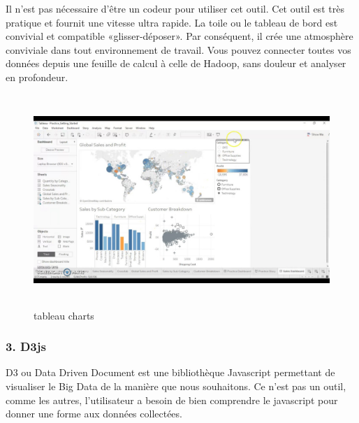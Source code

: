 \documentclass[french, a4paper, 12pt]{report}
\begin{document}
Il n’est pas nécessaire d’être un codeur pour utiliser cet outil. Cet outil est très pratique et fournit une vitesse ultra rapide. La toile ou le tableau de bord est convivial et compatible «glisser-déposer». Par conséquent, il crée une atmosphère conviviale dans tout environnement de travail. Vous pouvez connecter toutes vos données depuis une feuille de calcul à celle de Hadoop, sans douleur et analyser en profondeur.
\begin{figure}[!htp]
    \centering
    \includegraphics[height=8cm]{images/tableau.jpg}
    \caption{tableau charts}
    \label{fig:2.16}
\end{figure}
\subsubsection{3. D3js}
D3 ou Data Driven Document est une bibliothèque Javascript permettant de visualiser le Big Data de la manière que nous souhaitons. Ce n'est pas un outil, comme les autres, l'utilisateur a besoin de bien comprendre le javascript pour donner une forme aux données collectées. 
\end{document}
